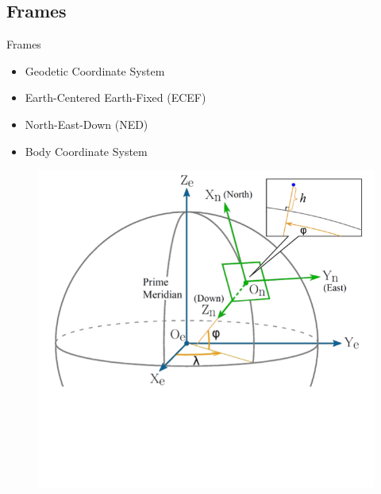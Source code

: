 \subsection{Frames}

\begin{frame}{Frames}{}

  \begin{itemize}
  \item Geodetic Coordinate System
  \item Earth-Centered Earth-Fixed (ECEF)
  \item North-East-Down (NED)
  \item Body Coordinate System
  
  \end{itemize}

 

  
\begin{figure}[H]
\centerline{
\includegraphics[scale=0.35]{figures/GeoTemp1.png}}
\label{fig:frames}
\end{figure}  
  
  
\end{frame}

